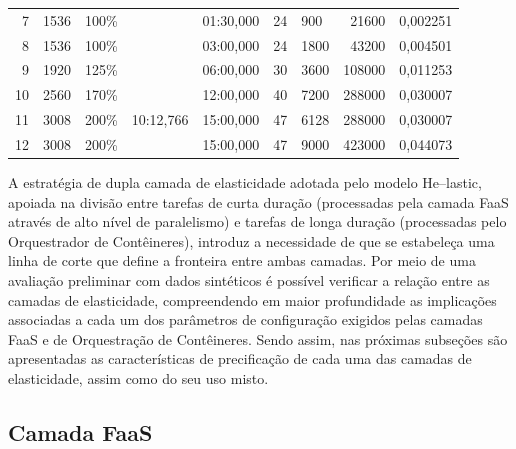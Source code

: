 \documentclass[english,brazilian]{UNISINOSmonografia} %
\newcommand\defaultFigureWidth{0.9}
\begin{document}
\begin{table}[tb]
\begin{minipage}{\defaultFigureWidth\textwidth}
\begin{tabularx}{\textwidth}{rrrrrWWrr}
			7 & 1536 & 100\% &  & 01:30,000 & 24 & 900 & 21600 & 0,002251 \\
			8 & 1536 & 100\% &  & 03:00,000 & 24 & 1800 & 43200 & 0,004501 \\
			9 & 1920 & 125\% &  & 06:00,000 & 30 & 3600 & 108000 & 0,011253 \\
			10 & 2560 & 170\% &  & 12:00,000 & 40 & 7200 & 288000 & 0,030007 \\
			11 & 3008 & 200\% & 10:12,766 & 15:00,000 & 47 & 6128 & 288000 & 0,030007 \\
			12 & 3008 & 200\% &  & 15:00,000 & 47 & 9000 & 423000 & 0,044073 \\ 
			\bottomrule
		\end{tabularx}
	\end{minipage}
\end{table}



A estratégia de dupla camada de elasticidade adotada pelo modelo \textsf{He}--lastic, apoiada na divisão entre tarefas de curta duração (processadas pela camada FaaS através de alto nível de paralelismo) e tarefas de longa duração (processadas pelo Orquestrador de Contêineres), introduz a necessidade de que se estabeleça uma linha de corte que define a fronteira entre ambas camadas.
%
Por meio de uma avaliação preliminar com dados sintéticos é possível verificar a relação entre as camadas de elasticidade, compreendendo em maior profundidade as implicações associadas a cada um dos parâmetros de configuração exigidos pelas camadas FaaS e de Orquestração de Contêineres.
%
Sendo assim, nas próximas subseções são apresentadas as características de precificação de cada uma das camadas de elasticidade, assim como do seu uso misto.





\subsection{Camada FaaS}
\label{sec:modelo-custben-faas}
\end{document}
